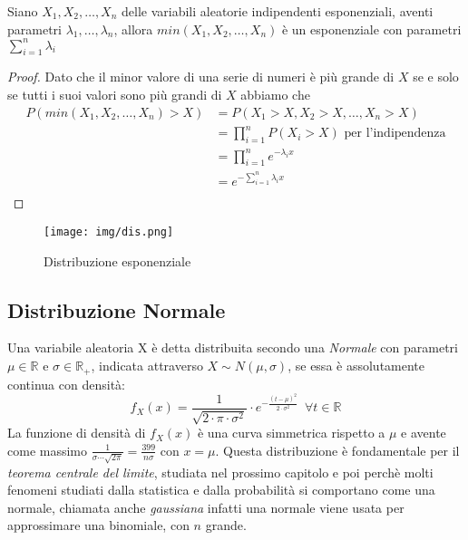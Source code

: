 \documentclass[a4paper,12pt, oneside]{book}
\newcommand{\numberset}{\mathbb}
\newcommand{\R}{\numberset{R}}
\begin{document}
\begin{teo}
    Siano $X_1, X_2, \dots, X_n$ delle variabili aleatorie indipendenti esponenziali, aventi parametri $\lambda_1,
    \dots, \lambda_n$, allora $min(X_1, X_2, \dots, X_n)$ è un esponenziale con parametri $\sum _{i = 1}^n \lambda_i$
\end{teo}
\begin{proof}
    Dato che il minor valore di una serie di numeri è più grande di $X$ se e solo se tutti i suoi valori sono più grandi
    di $X$ abbiamo che
    \[ \begin{split}
        P(min(X_1, X_2, \dots, X_n) > X) & = P(X_1 > X, X_2 > X, \dots, X_n > X)\\
                                         & = \prod _{i = 1}^n P(X_i > X) \mbox{ per l'indipendenza}\\
                                         & = \prod _{i = 1}^n e^{-\lambda_i x} \\
                                         & = e^{-\sum _{i = 1}^n \lambda_i x} \\
        \end{split} \]
\end{proof}
\begin{figure}
    \caption{Distribuzione esponenziale}
	\texttt{[image: img/dis.png]}
\end{figure}
\subsection{Distribuzione Normale}
Una variabile aleatoria X è detta distribuita secondo una \emph{Normale} con parametri $\mu \in \R$ e $\sigma \in \R_+$,
indicata attraverso $X \sim N(\mu, \sigma)$, se essa è assolutamente continua con densità:
\[f_X(x)=\frac{1}{\sqrt{2\cdot \pi\cdot \sigma^2}}\cdot e^{-\frac{(t-\mu)^2}{2\cdot \sigma^2}}\,\,\,\forall t\in\R\]
La funzione di densità di $f_X(x)$ è una curva simmetrica rispetto a $\mu$ e avente come massimo 
$\frac{1}{\sigma \cdots \sqrt{2 \pi}} =  \frac{399}{n \sigma}$ con $x = \mu$.\newline
Questa distribuzione è fondamentale per il \emph{teorema centrale del limite}, studiata nel prossimo
capitolo e poi perchè molti fenomeni studiati dalla statistica e dalla probabilità si comportano come una
normale, chiamata anche \emph{gaussiana} infatti una normale viene usata per approssimare una binomiale, con $n$ grande.
\end{document}

